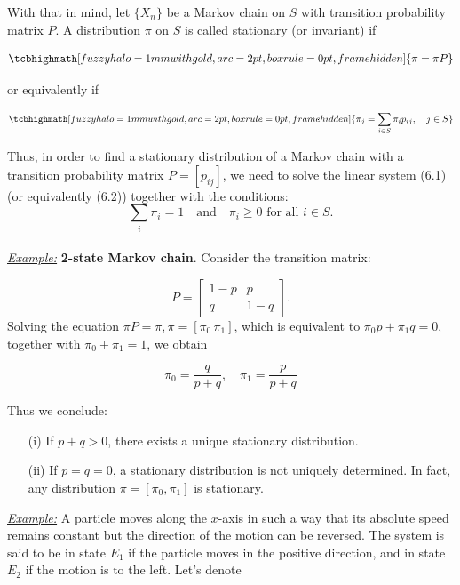 \documentclass[a4paper,10pt]{article}
\newcommand{\equationgold}[1]{
  \tcbhighmath[fuzzy halo=1mm with gold,arc=2pt,boxrule=0pt,frame hidden]{#1}
}
\begin{document}
With that in mind, let $\{X_n\}$ be a Markov chain on $S$ with transition probability matrix $P$. A distribution $\pi$ on $S$ is called stationary (or invariant) if


\begin{equation}
    \equationgold{
        \pi = \pi P    
    }
\end{equation}

or equivalently if

\begin{equation}
    \equationgold{
        \pi_j = \sum_{i \in S} \pi_i p_{ij}, \quad j \in S
    }
\end{equation}

Thus, in order to find a stationary distribution of a Markov chain with a transition probability matrix $P = [p_{ij}]$, we need to solve the linear system (6.1) (or equivalently (6.2)) together with the conditions:
$$
\sum_{i} \pi_i = 1 \quad \text{and} \quad \pi_i \geq 0 \text{ for all } i \in S.
$$\\

\noindent \textit{\underline{Example:}} \textbf{2-state Markov chain}. Consider the transition matrix:

$$
P = \begin{bmatrix}
1 - p & p \\
q & 1 - q
\end{bmatrix}.
$$
Solving the equation $\pi P = \pi, \pi = [\pi_0 \, \pi_1]$, which is equivalent to $\pi_0 p + \pi_1 q = 0$, together with $\pi_0 + \pi_1 = 1$, we obtain

$$
\pi_0 = \frac{q}{p + q}, \quad \pi_1 = \frac{p}{p + q}
$$

\noindent Thus we conclude:
\begin{itemize}
    \item[(i)] If $p + q > 0$, there exists a unique stationary distribution.
    \item[(ii)] If $p = q = 0$, a stationary distribution is not uniquely determined. In fact, any distribution $\pi = [\pi_0, \pi_1]$ is stationary.\\
\end{itemize}

\noindent \underline{\textit{Example:}} A particle moves along the $x$-axis in such a way that its absolute speed remains constant but the direction of the motion can be reversed. The system is said to be in state $E_1$ if the particle moves in the positive direction, and in state $E_2$ if the motion is to the left. Let's denote
\end{document}
